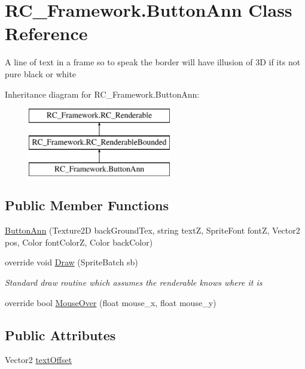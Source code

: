 \hypertarget{class_r_c___framework_1_1_button_ann}{}\section{R\+C\+\_\+\+Framework.\+Button\+Ann Class Reference}
\label{class_r_c___framework_1_1_button_ann}


A line of text in a frame so to speak the border will have illusion of 3D if its not pure black or white  


Inheritance diagram for R\+C\+\_\+\+Framework.\+Button\+Ann\+:\begin{figure}[H]
\begin{center}
\leavevmode
\includegraphics[height=3.000000cm]{class_r_c___framework_1_1_button_ann}
\end{center}
\end{figure}
\subsection*{Public Member Functions}
\begin{DoxyCompactItemize}
\item 
\mbox{\hyperlink{class_r_c___framework_1_1_button_ann_a8110236e18489fa16c2a760b0700aad4}{Button\+Ann}} (Texture2D back\+Ground\+Tex, string textZ, Sprite\+Font fontZ, Vector2 pos, Color font\+ColorZ, Color back\+Color)
\item 
override void \mbox{\hyperlink{class_r_c___framework_1_1_button_ann_ab513dd55d4cf3e1515761f0e4c5f9e44}{Draw}} (Sprite\+Batch sb)
\begin{DoxyCompactList}\small\item\em Standard draw routine which assumes the renderable knows where it is \end{DoxyCompactList}\item 
override bool \mbox{\hyperlink{class_r_c___framework_1_1_button_ann_a387c65413a4dbfd360cab56476fc21a4}{Mouse\+Over}} (float mouse\+\_\+x, float mouse\+\_\+y)
\end{DoxyCompactItemize}
\subsection*{Public Attributes}
\begin{DoxyCompactItemize}
\item 
Vector2 \mbox{\hyperlink{class_r_c___framework_1_1_button_ann_adf8a491a03cb62e48017ce118f216a6a}{text\+Offset}}
\end{DoxyCompactItemize}
